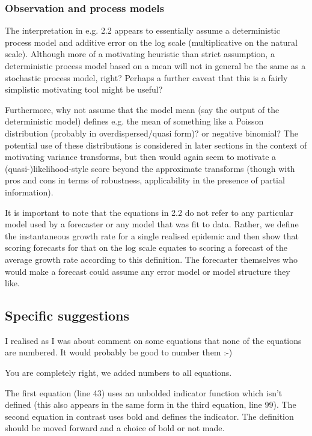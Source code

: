 \documentclass{article}
\newcommand{\black}{\color{black}}
\newcommand{\blue}{\color{blue}}
\begin{document}
\blue
\subsubsection{Observation and process models}
The interpretation in e.g. 2.2 appears to essentially assume a deterministic process model and additive error on the log scale (multiplicative on the natural scale). Although more of a motivating heuristic than strict assumption, a deterministic process model based on a mean will not in general be the same as a stochastic process model, right? Perhaps a further caveat that this is a fairly simplistic motivating tool might be useful?

Furthermore, why not assume that the model mean (say the output of the deterministic model) defines e.g. the mean of something like a Poisson distribution (probably in overdispersed/quasi form)? or negative binomial? The potential use of these distributions is considered in later sections in the context of motivating variance transforms, but then would again seem to motivate a (quasi-)likelihood-style score beyond the approximate transforms (though with pros and cons in terms of robustness, applicability in the presence of partial information).

\black
It is important to note that the equations in 2.2 do not refer to any particular model used by a forecaster or any model that was fit to data. Rather, we define the instantaneous growth rate for a single realised epidemic and then show that scoring forecasts for that on the log scale equates to scoring a forecast of the average growth rate according to this definition. The forecaster themselves who would make a forecast could assume any error model or model structure they like. 

\blue
\subsection{Specific suggestions}

I realised as I was about comment on some equations that none of the equations are numbered. It would probably be good to number them :-)

\black
You are completely right, we added numbers to all equations. 

\blue
The first equation (line 43) uses an unbolded indicator function which isn’t defined (this also appears in the same form in the third equation, line 99). The second equation in contrast uses bold and defines the indicator. The definition should be moved forward and a choice of bold or not made.
\end{document}

